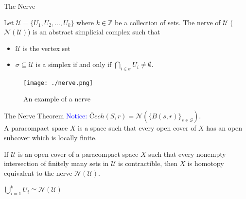 \documentclass{beamer}
\begin{document}
\begin{frame}{The Nerve}
    \begin{definition}     
        Let $\mathcal{U}=\{U_1,U_2,...,U_k\}$ where $k\in \mathbb{Z}$ be a collection of sets. \textcolor{myred}{The nerve} of $\mathcal{U}$ ($\mathcal{N}(\mathcal{U})$) is an abstract simplicial complex such that 
        \begin{itemize}
            \item $\mathcal{U}$ is the vertex set
            \item $\sigma \subseteq \mathcal{U}$ is a simplex if and only if $\bigcap\limits_{i \in \sigma}U_i \neq \emptyset$.
        \end{itemize}
    \end{definition}
    \begin{figure}
        \texttt{[image: ./nerve.png]}
        \caption{An example of a nerve\cite{virk}}
    \end{figure}
\end{frame}

\begin{frame}{The Nerve Theorem}
    \textcolor{blue}{Notice:} $\textit{Č}ech(S,r) = \mathcal{N}(\{B(s,r)\}_{s \in S})$.\\
    \vspace{0.5cm}
    A \textcolor{myred}{paracompact space} $X$ is a space such that every open cover of $X$ has an open subcover which is locally finite.\\
    \begin{theorem}
        If $\mathcal{U}$ is an open cover of a paracompact space $X$ such that every nonempty intersection of finitely many sets in $\mathcal{U}$ is contractible, then $X$ is homotopy equivalent to the nerve $\mathcal{N}(\mathcal{U})$.\cite{hatcher}
    \end{theorem}
    \begin{corollary}
        $\bigcup\limits_{i=1}^k U_i \simeq \mathcal{N}(\mathcal{U})$
    \end{corollary}
\end{frame}

\end{document}
